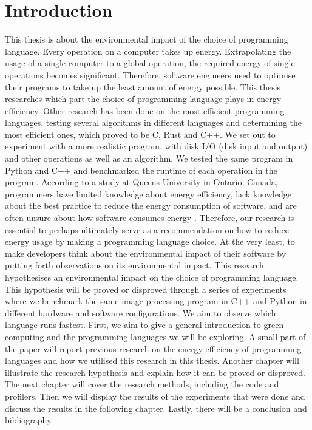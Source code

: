 \chapter{Introduction}
This thesis is about the environmental impact of the choice of programming language. Every operation on a computer takes up energy. Extrapolating the usage of a single computer to a global operation, the required energy of single operations becomes significant. Therefore, software engineers need to optimise their programs to take up the least amount of energy possible. This thesis researches which part the choice of programming language plays in energy efficiency.
Other research has been done on the most efficient programming languages, testing several algorithms in different languages and determining the most efficient ones, which proved to be C, Rust and C++. We set out to experiment with a more realistic program, with disk I/O (disk input and output) and other operations as well as an algorithm. We tested the same program in Python and C++ and benchmarked the runtime of each operation in the program.
According to a study at Queens University in Ontario, Canada, programmers have limited knowledge about energy efficiency, lack knowledge about the best practice to reduce the energy consumption of software, and are often unsure about how software consumes energy \cite{programmers}.
Therefore, our research is essential to perhaps ultimately serve as a recommendation on how to reduce energy usage by making a programming language choice. At the very least, to make developers think about the environmental impact of their software by putting forth observations on its environmental impact.
This research hypothesises an environmental impact on the choice of programming language. This hypothesis will be proved or disproved through a series of experiments where we benchmark the same image processing program in C++ and Python in different hardware and software configurations. We aim to observe which language runs fastest.
First, we aim to give a general introduction to green computing and the programming languages we will be exploring. A small part of the paper will report previous research on the energy efficiency of programming languages and how we utilised this research in this thesis. Another chapter will illustrate the research hypothesis and explain how it can be proved or disproved. The next chapter will cover the research methods, including the code and profilers. Then we will display the results of the experiments that were done and discuss the results in the following chapter. Lastly, there will be a conclusion and bibliography.
